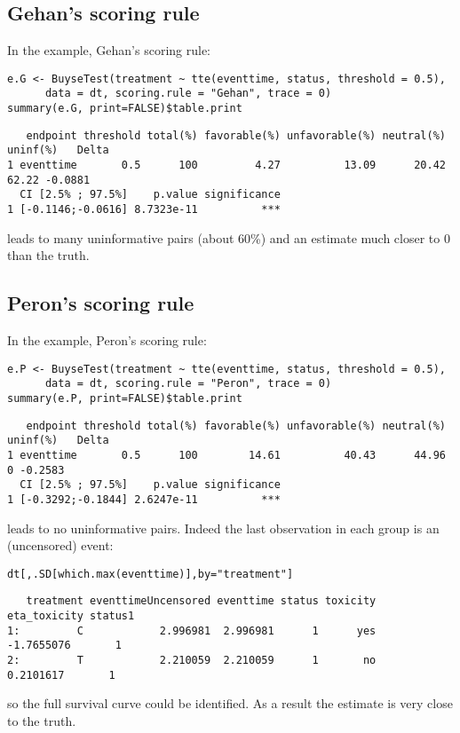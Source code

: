 \documentclass[12pt]{article}
\begin{document}
\subsection{Gehan's scoring rule}
\label{sec:org2aeca8e}
In the example, Gehan's scoring rule:
\lstset{language=r,label= ,caption= ,captionpos=b,numbers=none}
\begin{lstlisting}
e.G <- BuyseTest(treatment ~ tte(eventtime, status, threshold = 0.5),
	  data = dt, scoring.rule = "Gehan", trace = 0)
summary(e.G, print=FALSE)$table.print
\end{lstlisting}

\begin{verbatim}
   endpoint threshold total(%) favorable(%) unfavorable(%) neutral(%) uninf(%)   Delta
1 eventtime       0.5      100         4.27          13.09      20.42    62.22 -0.0881
  CI [2.5% ; 97.5%]    p.value significance
1 [-0.1146;-0.0616] 8.7323e-11          ***
\end{verbatim}

leads to many uninformative pairs (about 60\%) and an estimate much
closer to 0 than the truth.

\subsection{Peron's scoring rule}
\label{sec:orgb04e3c0}
In the example, Peron's scoring rule:
\lstset{language=r,label= ,caption= ,captionpos=b,numbers=none}
\begin{lstlisting}
e.P <- BuyseTest(treatment ~ tte(eventtime, status, threshold = 0.5),
	  data = dt, scoring.rule = "Peron", trace = 0)
summary(e.P, print=FALSE)$table.print
\end{lstlisting}

\begin{verbatim}
   endpoint threshold total(%) favorable(%) unfavorable(%) neutral(%) uninf(%)   Delta
1 eventtime       0.5      100        14.61          40.43      44.96        0 -0.2583
  CI [2.5% ; 97.5%]    p.value significance
1 [-0.3292;-0.1844] 2.6247e-11          ***
\end{verbatim}
leads to no uninformative pairs. Indeed the last observation in each group is an (uncensored) event:
\lstset{language=r,label= ,caption= ,captionpos=b,numbers=none}
\begin{lstlisting}
dt[,.SD[which.max(eventtime)],by="treatment"]
\end{lstlisting}

\begin{verbatim}
   treatment eventtimeUncensored eventtime status toxicity eta_toxicity status1
1:         C            2.996981  2.996981      1      yes   -1.7655076       1
2:         T            2.210059  2.210059      1       no    0.2101617       1
\end{verbatim}
so the full survival curve could be identified. As a result the estimate is very close to the
truth. 
\end{document}

